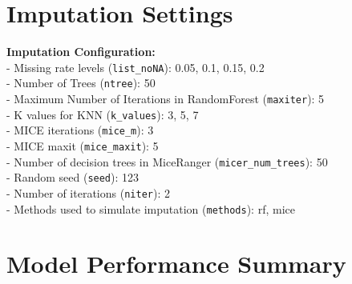 \documentclass[
]{article}
\begin{document}
\section{Imputation Settings}\label{imputation-settings}

\textbf{Imputation Configuration:}\\
- Missing rate levels (\texttt{list\_noNA}): 0.05, 0.1, 0.15, 0.2\\
- Number of Trees (\texttt{ntree}): 50\\
- Maximum Number of Iterations in RandomForest (\texttt{maxiter}): 5\\
- K values for KNN (\texttt{k\_values}): 3, 5, 7\\
- MICE iterations (\texttt{mice\_m}): 3\\
- MICE maxit (\texttt{mice\_maxit}): 5\\
- Number of decision trees in MiceRanger (\texttt{micer\_num\_trees}):
50\\
- Random seed (\texttt{seed}): 123\\
- Number of iterations (\texttt{niter}): 2\\
- Methods used to simulate imputation (\texttt{methods}): rf, mice

\newpage

\section{Model Performance Summary}\label{model-performance-summary}
\end{document}
